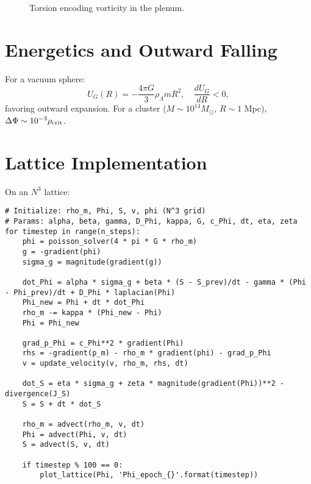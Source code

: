 \documentclass[11pt]{article}
\theoremstyle{plain}
\theoremstyle{definition}
\begin{document}
\begin{figure}[ht]
\centering
{}
\caption{Torsion encoding vorticity in the plenum.}
\label{fig:torsion}
\end{figure}

\section{Energetics and Outward Falling}
For a vacuum sphere:
\begin{equation}
U_G(R) = -\frac{4\pi G}{3} \rho_\Lambda m R^2, \quad \frac{dU_G}{dR} < 0,
\end{equation}
favoring outward expansion. For a cluster ($M \sim 10^{14} M_\odot$, $R \sim 1$ Mpc), $\Delta \Phi \sim 10^{-3} \rho_{\rm crit}$.

\section{Lattice Implementation}
On an $N^3$ lattice:
\begin{verbatim}
# Initialize: rho_m, Phi, S, v, phi (N^3 grid)
# Params: alpha, beta, gamma, D_Phi, kappa, G, c_Phi, dt, eta, zeta
for timestep in range(n_steps):
    phi = poisson_solver(4 * pi * G * rho_m)
    g = -gradient(phi)
    sigma_g = magnitude(gradient(g))
    
    dot_Phi = alpha * sigma_g + beta * (S - S_prev)/dt - gamma * (Phi - Phi_prev)/dt + D_Phi * laplacian(Phi)
    Phi_new = Phi + dt * dot_Phi
    rho_m -= kappa * (Phi_new - Phi)
    Phi = Phi_new
    
    grad_p_Phi = c_Phi**2 * gradient(Phi)
    rhs = -gradient(p_m) - rho_m * gradient(phi) - grad_p_Phi
    v = update_velocity(v, rho_m, rhs, dt)
    
    dot_S = eta * sigma_g + zeta * magnitude(gradient(Phi))**2 - divergence(J_S)
    S = S + dt * dot_S
    
    rho_m = advect(rho_m, v, dt)
    Phi = advect(Phi, v, dt)
    S = advect(S, v, dt)
    
    if timestep % 100 == 0:
        plot_lattice(Phi, 'Phi_epoch_{}'.format(timestep))
\end{verbatim}
\end{document}
